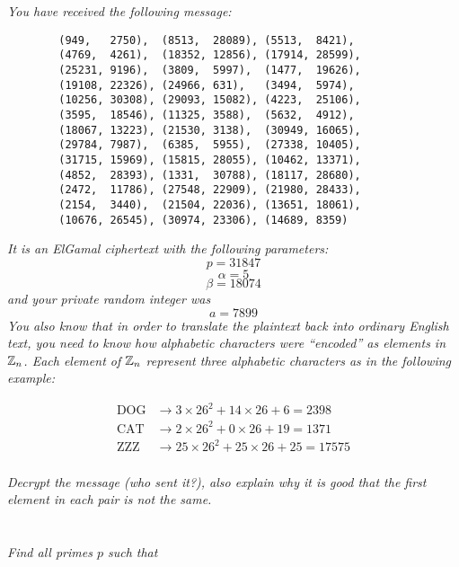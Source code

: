 \documentclass[12pt]{article}
\begin{document}
\section{} \textit{You have received the following message:}

    \begin{verbatim}
        (949,   2750),  (8513,  28089), (5513,  8421),
        (4769,  4261),  (18352, 12856), (17914, 28599),
        (25231, 9196),  (3809,  5997),  (1477,  19626),
        (19108, 22326), (24966, 631),   (3494,  5974),
        (10256, 30308), (29093, 15082), (4223,  25106),
        (3595,  18546), (11325, 3588),  (5632,  4912),
        (18067, 13223), (21530, 3138),  (30949, 16065),
        (29784, 7987),  (6385,  5955),  (27338, 10405),
        (31715, 15969), (15815, 28055), (10462, 13371),
        (4852,  28393), (1331,  30788), (18117, 28680),
        (2472,  11786), (27548, 22909), (21980, 28433),
        (2154,  3440),  (21504, 22036), (13651, 18061),
        (10676, 26545), (30974, 23306), (14689, 8359)
    \end{verbatim}

\textit{It is an ElGamal ciphertext with the following parameters:}
    $$p = 31847$$
    $$\alpha = 5$$
    $$\beta = 18074$$
\textit{and your private random integer was}
    $$a = 7899$$
\textit{You also know that in order to translate the plaintext back into ordinary English text, you need to know how alphabetic characters were ``encoded'' as elements in $\mathbb{Z}_n$.  Each element of $\mathbb{Z}_n$ represent three alphabetic characters as in the following example:}

    \begin{align*}
        \text{DOG} &\to 3  \times 26^2 + 14 \times 26 + 6  = 2398\\
        \text{CAT} &\to 2  \times 26^2 + 0  \times 26 + 19 = 1371\\
        \text{ZZZ} &\to 25 \times 26^2 + 25 \times 26 + 25 = 17575\\
    \end{align*}

\textit{Decrypt the message (who sent it?), also explain why it is good that the first element in each pair is not the same.}

\newpage

\section{} \textit{Find all primes $p$ such that}
\end{document}
